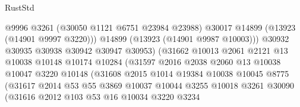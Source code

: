 \begin{lexlean}{RustStd}
\begin{coremodule}
                                      @9996
                                      @3261
                                      (@30050 @1121 @6751 @23984 @23988)
                                      @30017
                                      @14899
                                      (@13923 (@14901 @9997 @3220)))
                                    @14899
                                    (@13923 (@14901 @9987 @10003)))
                                  @30932
                                  @30935
                                  @30938
                                  @30942
                                  @30947
                                  @30953)
                                (@31662
                                  @10013
                                  @2061
                                  @2121
                                  @13
                                  @10038
                                  @10148
                                  @10174
                                  @10284
                                  (@31597
                                    @2016
                                    @2038
                                    @2060
                                    @13
                                    @10038
                                    @10047
                                    @3220
                                    @10148
                                    (@31608
                                      @2015
                                      @1014
                                      @19384
                                      @10038
                                      @10045
                                      @8775
                                      (@31617
                                        @2014
                                        @53
                                        @55
                                        @3869
                                        @10037
                                        @10044
                                        @3255
                                        @10018
                                        @3261
                                        @30090
                                        (@31616
                                          @2012
                                          @103
                                          @53
                                          @16
                                          @10034
                                          @3220
                                          @3234

\end{coremodule}
\end{lexlean}

